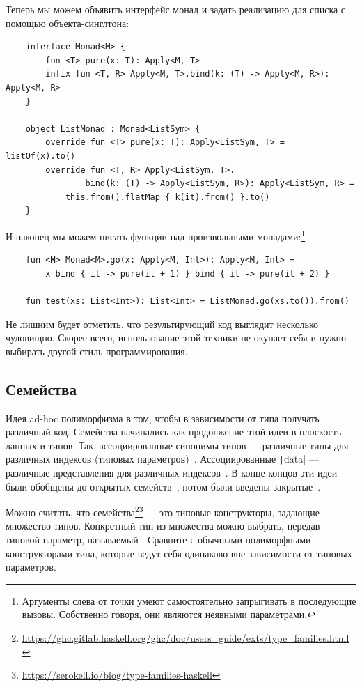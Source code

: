 Теперь мы можем объявить интерфейс монад и задать реализацию для списка с помощью объекта-синглтона:
\begin{verbatim}
    interface Monad<M> {
        fun <T> pure(x: T): Apply<M, T>
        infix fun <T, R> Apply<M, T>.bind(k: (T) -> Apply<M, R>): Apply<M, R>
    }

    object ListMonad : Monad<ListSym> {
        override fun <T> pure(x: T): Apply<ListSym, T> = listOf(x).to()
        override fun <T, R> Apply<ListSym, T>.
                bind(k: (T) -> Apply<ListSym, R>): Apply<ListSym, R> =
            this.from().flatMap { k(it).from() }.to()
    }
\end{verbatim}
И наконец мы можем писать функции над произвольными монадами:\footnote{Аргументы слева от точки умеют самостоятельно запрыгивать в последующие вызовы. Собственно говоря, они являются неявными параметрами.}
\begin{verbatim}
    fun <M> Monad<M>.go(x: Apply<M, Int>): Apply<M, Int> =
        x bind { it -> pure(it + 1) } bind { it -> pure(it + 2) }

    fun test(xs: List<Int>): List<Int> = ListMonad.go(xs.to()).from()
\end{verbatim}

Не лишним будет отметить, что результирующий код выглядит несколько чудовищно.
Скорее всего, использование этой техники не окупает себя и нужно выбирать другой стиль программирования.

\subsection{Семейства} \label{subsec:families}

Идея ad-hoc полиморфизма в том, чтобы в зависимости от типа получать различный код.
Семейства начинались как продолжение этой идеи в плоскость данных и типов.
Так, ассоциированные синонимы типов --- различные типы для различных индексов (типовых параметров)~\cite{chakravarty2005associated-syn}.
Ассоциированные \texttt|data| --- различные представления для различных индексов~\cite{chakravarty2005associated}.
В конце концов эти идеи были обобщены до открытых семейств~\cite{schrijvers2008type}, потом были введены закрытые~\cite{eisenberg2014closed}.

Можно считать, что семейства\footnote{\url{https://ghc.gitlab.haskell.org/ghc/doc/users_guide/exts/type_families.html}}\footnote{\url{https://serokell.io/blog/type-families-haskell}} --- это типовые конструкторы, задающие множество типов.
Конкретный тип из множества можно выбрать, передав типовой параметр, называемый .
Сравните с обычными полиморфными конструкторами типа, которые ведут себя одинаково вне зависимости от типовых параметров.

